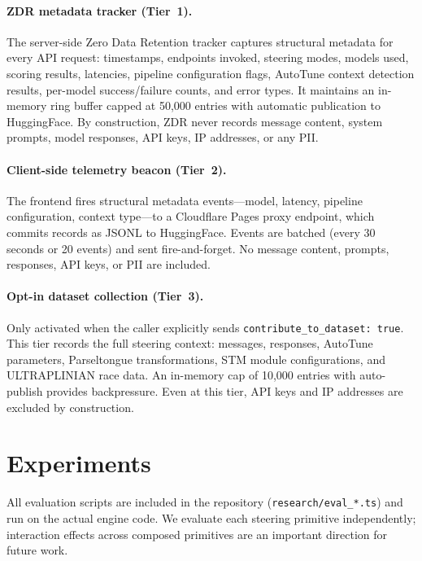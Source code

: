 \documentclass[11pt]{article}
\begin{document}
\paragraph{ZDR metadata tracker (Tier~1).} The server-side Zero Data Retention tracker captures structural metadata for every API request: timestamps, endpoints invoked, steering modes, models used, scoring results, latencies, pipeline configuration flags, AutoTune context detection results, per-model success/failure counts, and error types. It maintains an in-memory ring buffer capped at 50{,}000 entries with automatic publication to HuggingFace. By construction, ZDR never records message content, system prompts, model responses, API keys, IP addresses, or any PII.

\paragraph{Client-side telemetry beacon (Tier~2).} The frontend fires structural metadata events---model, latency, pipeline configuration, context type---to a Cloudflare Pages proxy endpoint, which commits records as JSONL to HuggingFace. Events are batched (every 30 seconds or 20 events) and sent fire-and-forget. No message content, prompts, responses, API keys, or PII are included.

\paragraph{Opt-in dataset collection (Tier~3).} Only activated when the caller explicitly sends \texttt{contribute\_to\_dataset: true}. This tier records the full steering context: messages, responses, AutoTune parameters, Parseltongue transformations, STM module configurations, and ULTRAPLINIAN race data. An in-memory cap of 10{,}000 entries with auto-publish provides backpressure. Even at this tier, API keys and IP addresses are excluded by construction.

\section{Experiments}
\label{sec:experiments}

All evaluation scripts are included in the repository (\texttt{research/eval\_*.ts}) and run on the actual engine code. We evaluate each steering primitive independently; interaction effects across composed primitives are an important direction for future work.
\end{document}
